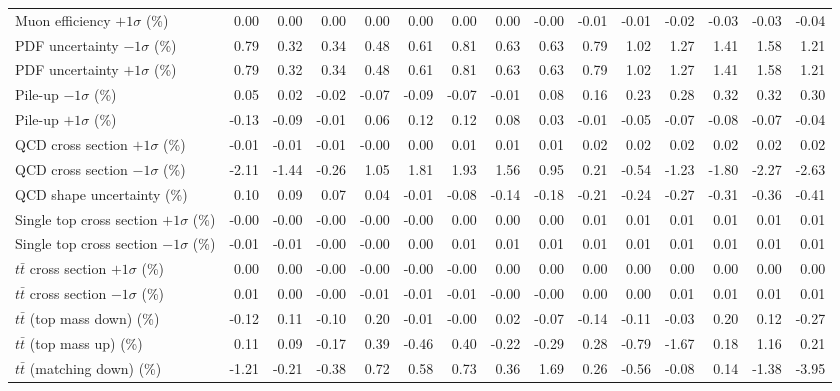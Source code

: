 \begin{table}[htbp]
{\begin{tabular}{lrrrrrrrrrrrrrr}
Muon efficiency $+1\sigma$ (\%) & 0.00 & 0.00 & 0.00 & 0.00 & 0.00 & 0.00 & 0.00 & -0.00 & -0.01 & -0.01 & -0.02 & -0.03 & -0.03 & -0.04 \\ 
PDF uncertainty $-1\sigma$ (\%) & 0.79 & 0.32 & 0.34 & 0.48 & 0.61 & 0.81 & 0.63 & 0.63 & 0.79 & 1.02 & 1.27 & 1.41 & 1.58 & 1.21 \\ 
PDF uncertainty $+1\sigma$ (\%) & 0.79 & 0.32 & 0.34 & 0.48 & 0.61 & 0.81 & 0.63 & 0.63 & 0.79 & 1.02 & 1.27 & 1.41 & 1.58 & 1.21 \\ 
Pile-up $-1\sigma$ (\%) & 0.05 & 0.02 & -0.02 & -0.07 & -0.09 & -0.07 & -0.01 & 0.08 & 0.16 & 0.23 & 0.28 & 0.32 & 0.32 & 0.30 \\ 
Pile-up $+1\sigma$ (\%) & -0.13 & -0.09 & -0.01 & 0.06 & 0.12 & 0.12 & 0.08 & 0.03 & -0.01 & -0.05 & -0.07 & -0.08 & -0.07 & -0.04 \\ 
QCD cross section \ensuremath{+1\sigma} (\%) & -0.01 & -0.01 & -0.01 & -0.00 & 0.00 & 0.01 & 0.01 & 0.01 & 0.02 & 0.02 & 0.02 & 0.02 & 0.02 & 0.02 \\ 
QCD cross section \ensuremath{-1\sigma} (\%) & -2.11 & -1.44 & -0.26 & 1.05 & 1.81 & 1.93 & 1.56 & 0.95 & 0.21 & -0.54 & -1.23 & -1.80 & -2.27 & -2.63 \\ 
QCD shape uncertainty (\%) & 0.10 & 0.09 & 0.07 & 0.04 & -0.01 & -0.08 & -0.14 & -0.18 & -0.21 & -0.24 & -0.27 & -0.31 & -0.36 & -0.41 \\ 
Single top cross section $+1\sigma$ (\%) & -0.00 & -0.00 & -0.00 & -0.00 & -0.00 & 0.00 & 0.00 & 0.00 & 0.01 & 0.01 & 0.01 & 0.01 & 0.01 & 0.01 \\ 
Single top cross section $-1\sigma$ (\%) & -0.01 & -0.01 & -0.00 & -0.00 & 0.00 & 0.01 & 0.01 & 0.01 & 0.01 & 0.01 & 0.01 & 0.01 & 0.01 & 0.01 \\ 
$t\bar{t}$ cross section $+1\sigma$ (\%) & 0.00 & 0.00 & -0.00 & -0.00 & -0.00 & -0.00 & 0.00 & 0.00 & 0.00 & 0.00 & 0.00 & 0.00 & 0.00 & 0.00 \\ 
$t\bar{t}$ cross section $-1\sigma$ (\%) & 0.01 & 0.00 & -0.00 & -0.01 & -0.01 & -0.01 & -0.00 & -0.00 & 0.00 & 0.00 & 0.01 & 0.01 & 0.01 & 0.01 \\ 
$t\bar{t}$ (top mass down) (\%) & -0.12 & 0.11 & -0.10 & 0.20 & -0.01 & -0.00 & 0.02 & -0.07 & -0.14 & -0.11 & -0.03 & 0.20 & 0.12 & -0.27 \\ 
$t\bar{t}$ (top mass up) (\%) & 0.11 & 0.09 & -0.17 & 0.39 & -0.46 & 0.40 & -0.22 & -0.29 & 0.28 & -0.79 & -1.67 & 0.18 & 1.16 & 0.21 \\ 
$t\bar{t}$ (matching down) (\%) & -1.21 & -0.21 & -0.38 & 0.72 & 0.58 & 0.73 & 0.36 & 1.69 & 0.26 & -0.56 & -0.08 & 0.14 & -1.38 & -3.95 \\ 

\end{tabular}}
\end{table}
